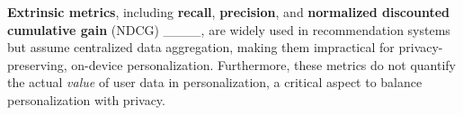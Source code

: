 \textbf{Extrinsic metrics}, including \textbf{recall}, \textbf{precision}, and \textbf{normalized discounted
cumulative gain} (NDCG) ____, are widely used in recommendation systems but assume centralized data aggregation, making them impractical for privacy-preserving, on-device personalization. Furthermore, these metrics do not quantify the actual \emph{value} of user data in personalization, a critical aspect to balance personalization with privacy.